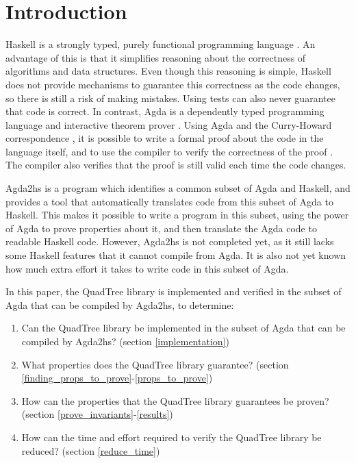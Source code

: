 \section{Introduction}
Haskell is a strongly typed, purely functional programming language \cite{haskell}. An advantage of this is that it simplifies reasoning about the correctness of algorithms and data structures. Even though this reasoning is simple, Haskell does not provide mechanisms to guarantee this correctness as the code changes, so there is still a risk of making mistakes. Using tests can also never guarantee that code is correct. In contrast, Agda is a dependently typed programming language and interactive theorem prover \cite{agda}. Using Agda and the Curry-Howard correspondence \cite{chc}, it is possible to write a formal proof about the code in the language itself, and to use the compiler to verify the correctness of the proof \cite{schwaab, van}. The compiler also verifies that the proof is still valid each time the code changes.

Agda2hs \cite{agda2hs} is a program which identifies a common subset of Agda and Haskell, and provides a tool that automatically translates code from this subset of Agda to Haskell. This makes it possible to write a program in this subset, using the power of Agda to prove properties about it, and then translate the Agda code to readable Haskell code. However, Agda2hs is not completed yet, as it still lacks some Haskell features that it cannot compile from Agda. It is also not yet known how much extra effort it takes to write code in this subset of Agda.

In this paper, the QuadTree library\cite{quadtree} is implemented and verified in the subset of Agda that can be compiled by Agda2hs, to determine:
\begin{enumerate}[label=(\roman*)]
	\itemsep-0.2em 
	\item Can the QuadTree library be implemented in the subset of Agda that can be compiled by Agda2hs? (section \ref{implementation})
	\item What properties does the QuadTree library guarantee? (section \ref{finding_props_to_prove}-\ref{props_to_prove})
	\item How can the properties that the QuadTree library guarantees be proven? (section \ref{prove_invariants}-\ref{results})
	\item How can the time and effort required to verify the QuadTree library be reduced? (section \ref{reduce_time})
\end{enumerate}
